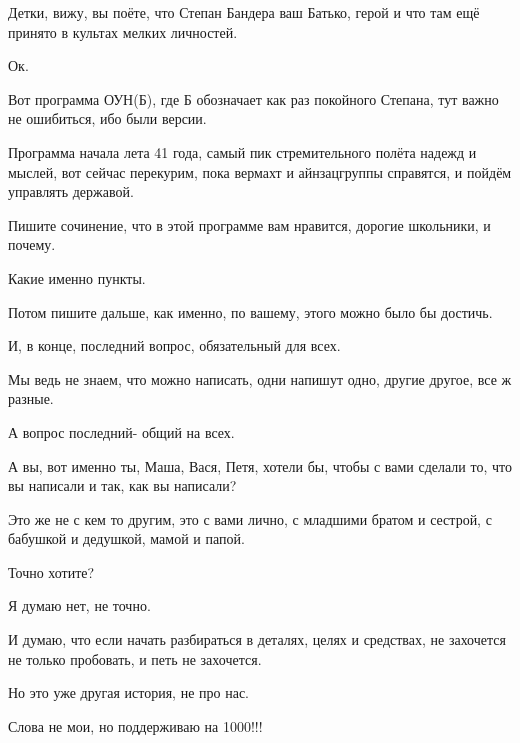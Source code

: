 Детки, вижу, вы поёте, что Степан Бандера ваш Батько, герой и что там ещё
принято в культах мелких личностей.

Ок.

Вот программа ОУН(Б), где Б обозначает как раз покойного Степана, тут важно не
ошибиться, ибо были версии.

Программа начала лета 41 года, самый пик стремительного полёта надежд и мыслей,
вот сейчас перекурим, пока вермахт и айнзацгруппы справятся, и пойдём управлять
державой.

Пишите сочинение, что в этой программе вам нравится, дорогие школьники, и
почему.

Какие именно пункты.

Потом пишите дальше, как именно, по вашему, этого можно было бы достичь.

И, в конце, последний вопрос, обязательный для всех.

Мы ведь не знаем, что можно написать, одни напишут одно, другие другое, все ж
разные.

А вопрос последний- общий на всех.

А вы, вот именно ты, Маша, Вася, Петя, хотели бы, чтобы с вами сделали то, что
вы написали и так, как вы написали?

Это же не с кем то другим, это с вами лично, с младшими братом и сестрой, с
бабушкой и дедушкой, мамой и папой.

Точно хотите?

Я думаю нет, не точно.

И думаю, что если начать разбираться в деталях, целях и средствах, не захочется
не только пробовать, и петь не захочется.

Но это уже другая история, не про нас.

Слова не мои, но поддерживаю на 1000!!!
